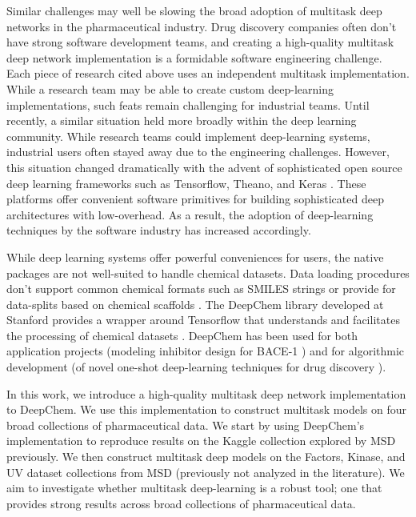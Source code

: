 Similar challenges may well be slowing the broad adoption of multitask deep networks in the pharmaceutical industry. Drug discovery companies often don't have strong software development teams, and creating a high-quality multitask deep network implementation is a formidable software engineering challenge. Each piece of research cited above uses an independent multitask implementation. While a research team may be able to create custom deep-learning implementations, such feats remain challenging for industrial teams. Until recently, a similar situation held more broadly within the deep learning community. While research teams could implement deep-learning systems, industrial users often stayed away due to the engineering challenges. However, this situation changed dramatically with the advent of sophisticated open source deep learning frameworks such as Tensorflow, Theano, and Keras \cite{abadi2016tensorflow,bastien2012theano,chollet2015keras}. These platforms offer convenient software primitives for building sophisticated deep architectures with low-overhead. As a result, the adoption of deep-learning techniques by the software industry has increased accordingly.

While deep learning systems offer powerful conveniences for users, the native
packages are not well-suited to handle chemical datasets. Data loading procedures don't support common chemical formats such as SMILES strings \cite{weininger1988smiles} or provide for data-splits based on chemical scaffolds \cite{bemis1996properties}. The DeepChem library developed at Stanford provides a wrapper around Tensorflow that understands and facilitates the processing of chemical datasets \cite{deepchem}. DeepChem has been used for both application projects (modeling inhibitor design for BACE-1 \cite{subramanian2016computational}) and for algorithmic development (of novel one-shot deep-learning techniques for drug discovery \cite{altae2017low}).

In this work, we introduce a high-quality multitask deep network implementation to DeepChem. We use this implementation to construct multitask models on four broad collections of pharmaceutical data. We start by using DeepChem's implementation to reproduce results on the Kaggle collection explored by MSD previously. We then construct multitask deep models on the Factors, Kinase, and UV dataset collections from MSD (previously not analyzed in the literature). We aim to investigate whether multitask deep-learning is a robust tool; one that provides strong results across broad collections of pharmaceutical data.

